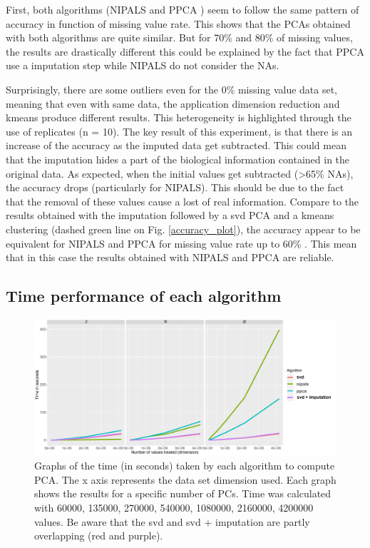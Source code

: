 \documentclass[a4paper, 11pt, twocolumn]{article}
\begin{document}
First, both algorithms (NIPALS and PPCA \citep{pcaMethods}) seem to follow the same pattern of accuracy in function of missing value rate. This shows that the PCAs obtained with both algorithms are quite similar. But for 70\% and 80\% of missing values, the results are drastically different this could be explained by the fact that PPCA use a imputation step while NIPALS do not consider the NAs.

Surprisingly, there are some outliers even for the 0\% missing value data set, meaning that even with same data, the application dimension reduction and kmeans produce different results. This heterogeneity is highlighted through the use of replicates (n = 10). The key result of this experiment, is that there is an increase of the accuracy as the imputed data get subtracted. This could mean that the imputation hides a part of the biological information contained in the original data. As expected, when the initial values get subtracted (>65\% NAs), the accuracy drops (particularly for NIPALS). This should be due to the fact that the removal of these values cause a lost of real information. Compare to the results obtained with the imputation followed by a svd PCA and a kmeans clustering (dashed green line on Fig. \ref{accuracy_plot}), the accuracy appear to be equivalent for NIPALS and PPCA for missing value rate up to 60\% . This mean that in this case the results obtained with NIPALS and PPCA are reliable. 



\subsection{Time performance of each algorithm}

\begin{figure}[!ht]
    \centering
    \includegraphics[width =  \linewidth]{bench_cropped.pdf}
    \caption{\small Graphs of the time (in seconds) taken by each algorithm to compute PCA. The x axis represents the data set dimension used. Each graph shows the results for a specific number of PCs. \scriptsize Time was calculated with 60000, 135000, 270000,  540000, 1080000, 2160000, 4200000 values. Be aware that the svd and svd + imputation are partly overlapping (red and purple).
    }
    \label{bench_plot}
\end{figure}
\end{document}
